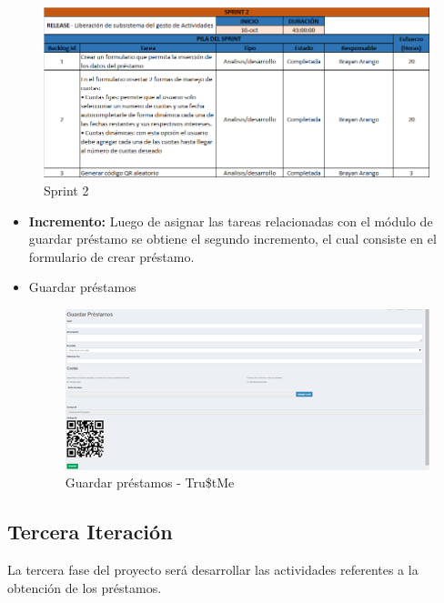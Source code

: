 {{			\begin{figure}[H]
				\centering
				\includegraphics[width=1\linewidth]{development/sprint2.png}
				\caption{Sprint 2}
			\end{figure}
			
			\begin{itemize}
				
				\item \textbf{Incremento:} Luego de asignar las tareas relacionadas con el módulo de guardar préstamo se obtiene el segundo incremento, el cual consiste en el formulario de crear préstamo.
				
				
				\item Guardar préstamos
				\begin{figure}[H]
					\centering
					\includegraphics[width=1\linewidth]{development/guardarprestamos.png}
					\caption{Guardar préstamos - Tru\$tMe}
				\end{figure}		
				
			\end{itemize}
			
			
			
		}

		\subsection{Tercera Iteración}
		{La tercera fase del proyecto será desarrollar las actividades referentes a la obtención de los préstamos.\\
			
}}
